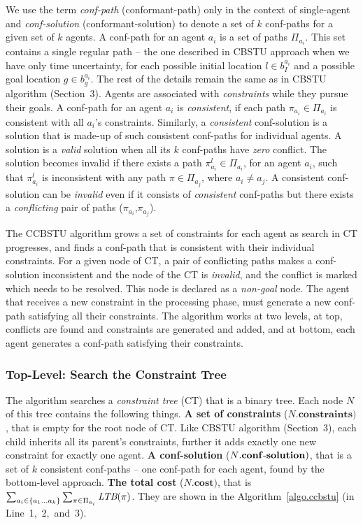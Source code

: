 \documentclass{article}
\begin{document}
\noindent {} 
We use the term \emph{conf-path} (conformant-path) only in the context of single-agent and \emph{conf-solution} (conformant-solution) to denote a set of $k$ conf-paths for a given set of $k$ agents. A conf-path for an agent $a_i$ is a set of paths $\Pi_{a_i}$. 
This set contains a single regular path -- the one described in CBSTU approach when we have only time uncertainty, for each possible initial location $l \in b_{I}^{a_i}$ and a possible goal location $g \in b_{g}^{a_i}$. 
The rest of the details remain the same as in CBSTU algorithm (Section~3). Agents are associated with \emph{constraints} while they pursue their goals. A conf-path for an agent $a_i$ is \emph{consistent}, if each path $\pi_{a_i} \in \Pi_{a_i}$ is consistent with all $a_i$'s constraints. 
%
Similarly, a \emph{consistent} conf-solution is a solution that is made-up of such consistent conf-paths for individual agents. A solution is a \emph{valid} solution when all its $k$ conf-paths have \emph{zero} conflict.
The solution becomes invalid if there exists a path $\pi_{a_i}^l \in \Pi_{a_i}$, for an agent $a_i$, such that $\pi_{a_i}^l$ is inconsistent with any path $\pi \in \Pi_{a_j}$, where $a_i \neq a_j$.
%
A consistent conf-solution can be \emph{invalid} even if it consists of \emph{consistent} conf-paths but there exists a \emph{conflicting} pair of paths ($\pi_{a_i}$,$\pi_{a_j}$). 
%

The CCBSTU algorithm grows a set of constraints for each agent as search in CT progresses, and finds a conf-path that is consistent with their
individual constraints. 
For a given node of CT, a pair of conflicting paths makes a conf-solution inconsistent and the node of the CT is \emph{invalid}, and the conflict is marked which needs to be resolved. This node is declared as a \emph{non-goal} node.
The agent that receives a new constraint in the processing phase, must generate a new conf-path satisfying all their constraints. The algorithm works at two levels, at top, conflicts are found and constraints are generated and added, and at bottom, each agent generates a conf-path satisfying their constraints. 

\subsubsection{Top-Level: Search the Constraint Tree}
The algorithm searches a \emph{constraint tree} (CT) that is a binary tree. Each node $N$ of this tree contains the following things.  
\textbf{A set of constraints} ($N.\mathbf{constraints})$, that is empty for the root node of CT. Like CBSTU algorithm (Section~3), each child inherits all its parent's constraints, further it adds  exactly one new constraint for exactly one agent. \textbf{A conf-solution} ($N\mathbf{.conf\textnormal{-}solution})$, that is a set of $k$ consistent conf-paths -- one conf-path for each agent, found by the bottom-level approach. \textbf{The total cost} ($N\mathbf{.cost})$, that is $\sum_{a_i \in \{a_1...a_k\}} \sum_{\pi \in \Pi_{a_i}} \emph{LTB}(\pi)$. They are shown in the Algorithm~\ref{algo.ccbstu} (in Line~1,~2,~and~3).
\end{document}

